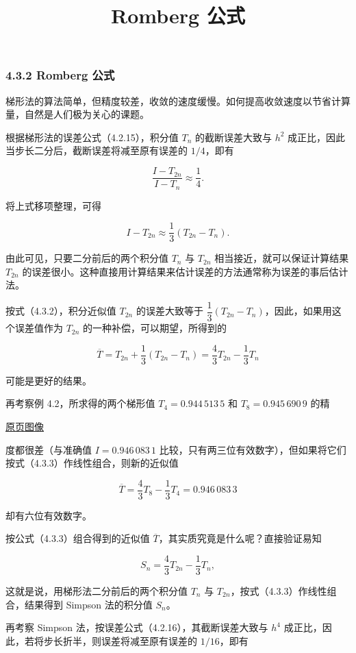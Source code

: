 \documentclass[
  10pt,
  fontset=fandol]{ctexart}
\title{Romberg 公式}
\author{}
\date{}
\begin{document}
\maketitle

\subsubsection{4.3.2 Romberg 公式}\label{romberg-ux516cux5f0f}

梯形法的算法简单，但精度较差，收敛的速度缓慢。如何提高收敛速度以节省计算量，自然是人们极为关心的课题。

根据梯形法的误差公式（4.2.15），积分值 \(T_n\) 的截断误差大致与 \(h^2\) 成正比，因此当步长二分后，截断误差将减至原有误差的 \(1/4\)，即有

\[
\frac{I-T_{2n}}{I-T_n}\approx\frac14.
\]

将上式移项整理，可得

\[
I-T_{2n}\approx\frac13(T_{2n}-T_n).
\tag{4.3.2}
\]

由此可见，只要二分前后的两个积分值 \(T_n\) 与 \(T_{2n}\) 相当接近，就可以保证计算结果 \(T_{2n}\) 的误差很小。这种直接用计算结果来估计误差的方法通常称为误差的事后估计法。

按式（4.3.2），积分近似值 \(T_{2n}\) 的误差大致等于 \(\dfrac13(T_{2n}-T_n)\)，因此，如果用这个误差值作为 \(T_{2n}\) 的一种补偿，可以期望，所得到的

\[
\overline T=T_{2n}+\frac13(T_{2n}-T_n)=\frac43T_{2n}-\frac13T_n
\tag{4.3.3}
\]

可能是更好的结果。

再考察例 4.2，所求得的两个梯形值 \(T_4=0.944\,513\,5\) 和 \(T_8=0.945\,690\,9\) 的精

\href{../../source-images/pdf-103.jpeg}{原页图像}

度都很差（与准确值 \(I=0.946\,083\,1\) 比较，只有两三位有效数字），但如果将它们按式（4.3.3）作线性组合，则新的近似值

\[
\overline T=\frac43T_8-\frac13T_4=0.946\,083\,3
\]

却有六位有效数字。

按公式（4.3.3）组合得到的近似值 \(\overline T\)，其实质究竟是什么呢？直接验证易知

\[
S_n=\frac43T_{2n}-\frac13T_n,
\tag{4.3.4}
\]

这就是说，用梯形法二分前后的两个积分值 \(T_n\) 与 \(T_{2n}\)，按式（4.3.3）作线性组合，结果得到 Simpson 法的积分值 \(S_n\)。

再考察 Simpson 法，按误差公式（4.2.16），其截断误差大致与 \(h^4\) 成正比，因此，若将步长折半，则误差将减至原有误差的 \(1/16\)，即有
\end{document}
